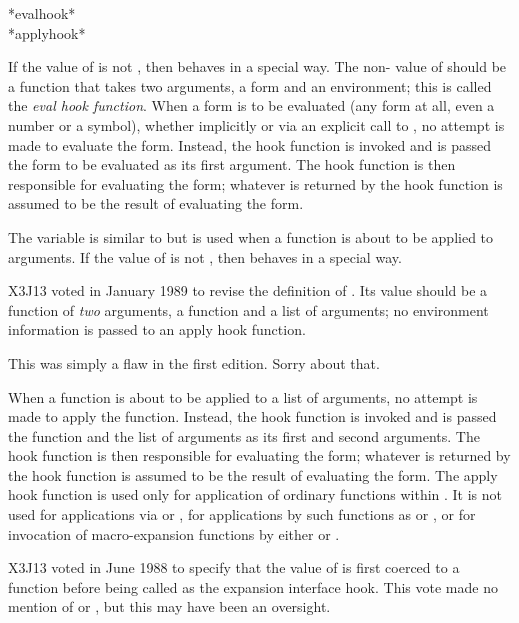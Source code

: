 \begin{defun}[Variable]
*evalhook* \\
*applyhook*

If the value of  is not {\false}, then  behaves
in a special way.  The non-{\false} value of  should be a function
that takes two arguments, a form and an environment;
this is called the \emph{eval hook function}.
When a form is to be evaluated (any form at all, even a number or a symbol),
whether implicitly or via an explicit call to , no attempt
is made to evaluate the form.
Instead, the hook function is invoked and is passed the form to be evaluated
as its first argument.  The hook function is then responsible for
evaluating the form; whatever is returned by the hook function is assumed
to be the result of evaluating the form.

The variable  is similar to  but is used
when a function is about to be applied to arguments.
If the value of  is not {\false}, then  behaves
in a special way.

\begin{new}
X3J13 voted in January 1989
to revise the definition of .
Its value should be a function of \emph{two} arguments,
a function and a list of arguments; no environment information is passed
to an apply hook function.

This was simply a flaw in the first edition.  Sorry about that.
\end{new}

When a function is about to be applied to a list of arguments,
no attempt is made to apply the function.
Instead, the hook function is invoked and is passed the function and the list
of arguments
as its first and second arguments.  The hook function is then responsible for
evaluating the form; whatever is returned by the hook function is assumed
to be the result of evaluating the form.
The apply hook function is used only for application of ordinary functions
within .  It is not used for applications via  or
, for applications by such functions as  or
, or for invocation of macro-expansion functions
by either  or .
\begin{newer}
X3J13 voted in June 1988  to specify
that the value of  is first coerced to a
function before being called as the expansion interface hook.
This vote made no mention of  or ,
but this may have been an oversight.


\end{newer}
\end{defun}
